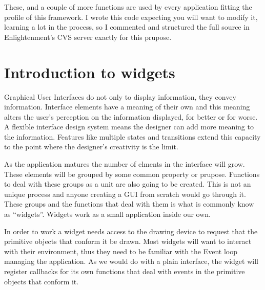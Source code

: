 \documentclass[12pt,a4paper,english]{book}
\begin{document}
These, and a couple of more functions are used by every application fitting the
profile of this framework. I wrote this code expecting you will want to modify
it, learning a lot in the process, so I commented and structured the full
source in Enlightenment's CVS server exactly for this prupose.



\hypertarget{introduction-to-widgets}{}
\chapter{Introduction to widgets}

Graphical User Interfaces do not only to display information, they convey
information. Interface elements have a meaning of their own and this meaning
alters the user's perception on the information displayed, for better or for
worse. A flexible interface design system means the designer can add more
meaning to the information. Features like multiple states and transitions
extend this capacity to the point where the designer's creativity is the limit.

As the application matures the number of elments in the interface will grow.
These elements will be grouped by some common property or prupose. Functions to
deal with these groups as a unit are also going to be created. This is not an
unique process and anyone creating a GUI from scratch would go through it.
These groups and the functions that deal with them is what is commonly know as
``widgets''. Widgets work as a small application inside our own.

In order to work a widget needs access to the drawing device to request that
the primitive objects that conform it be drawn. Most widgets will want to
interact with their environment, thus they need to be familiar with the Event
loop managing the application. As we would do with a plain interface, the
widget will register callbacks for its own functions that deal with events in
the primitive objects that conform it.

{\hfill{}\hfill}
\end{document}
